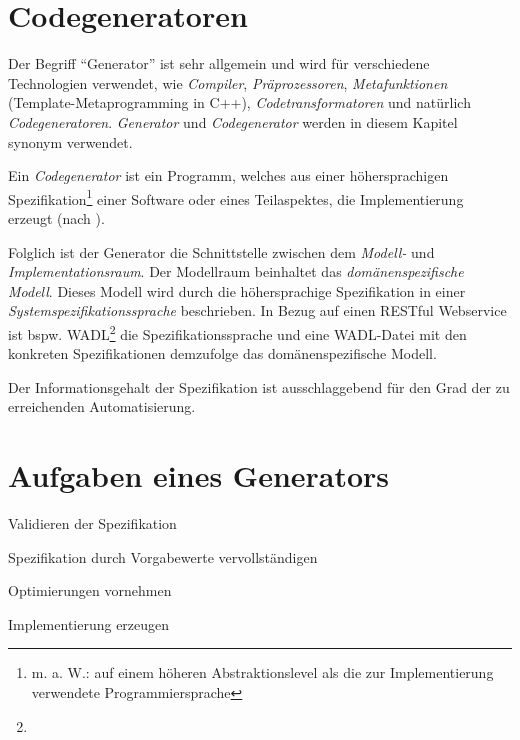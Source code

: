 \section{Codegeneratoren}


Der Begriff \enquote{Generator} ist sehr allgemein und wird für verschiedene Technologien verwendet, wie \emph{Compiler}, \emph{Präprozessoren}, \emph{Metafunktionen} (Template-Metaprogramming in C++), \emph{Codetransformatoren} und natürlich \emph{Codegeneratoren}. 
\emph{Generator} und \emph{Codegenerator} werden in diesem Kapitel synonym verwendet.

\begin{thesisDefinition}[Codegenerator]
Ein \emph{Codegenerator} ist ein Programm, welches aus einer höhersprachigen Spezifikation\footnote{m. a. W.: auf einem höheren Abstraktionslevel als die zur Implementierung verwendete Programmiersprache} einer Software oder eines Teilaspektes, die Implementierung erzeugt (nach \cite{czarnecki2000generative}).
\end{thesisDefinition}

Folglich ist der Generator die Schnittstelle zwischen dem \emph{Modell-} und \emph{Implementationsraum}. Der Modellraum beinhaltet das \emph{domänenspezifische Modell}. Dieses Modell wird durch die höhersprachige Spezifikation in einer \emph{Systemspezifikationssprache} beschrieben. In Bezug auf einen RESTful Webservice ist bspw. \gls{WADL}\footnote{} die Spezifikationssprache und eine WADL-Datei mit den konkreten Spezifikationen demzufolge das domänenspezifische Modell.

Der Informationsgehalt der Spezifikation ist ausschlaggebend für den Grad der zu erreichenden Automatisierung.

\section{Aufgaben eines Generators}
\label{sec:generator_tasks}

\begin{compactenum}
    \item Validieren der Spezifikation
    \item Spezifikation durch Vorgabewerte vervollständigen
    \item Optimierungen vornehmen
    \item Implementierung erzeugen
\end{compactenum}

